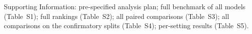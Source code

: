 \documentclass[journal=jcisd8,manuscript=article]{achemso}
\begin{document}
\begin{suppinfo}
Supporting Information: pre-specified analysis plan; full benchmark of all models (Table~S1); full rankings (Table~S2); all paired comparisons (Table~S3); all comparisons on the confirmatory splits (Table~S4); per-setting results (Table~S5).
\end{suppinfo}






\end{document}
